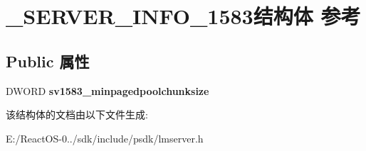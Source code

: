 \hypertarget{struct___s_e_r_v_e_r___i_n_f_o__1583}{}\section{\+\_\+\+S\+E\+R\+V\+E\+R\+\_\+\+I\+N\+F\+O\+\_\+1583结构体 参考}
\label{struct___s_e_r_v_e_r___i_n_f_o__1583}
\subsection*{Public 属性}
\begin{DoxyCompactItemize}
\item 
\mbox{\label{struct___s_e_r_v_e_r___i_n_f_o__1583_af8ea50dc40e20f337b62a6a86c1fe3ea}} 
D\+W\+O\+RD {\bfseries sv1583\+\_\+minpagedpoolchunksize}
\end{DoxyCompactItemize}


该结构体的文档由以下文件生成\+:\begin{DoxyCompactItemize}
\item 
E\+:/\+React\+O\+S-\/0../sdk/include/psdk/lmserver.\+h\end{DoxyCompactItemize}
